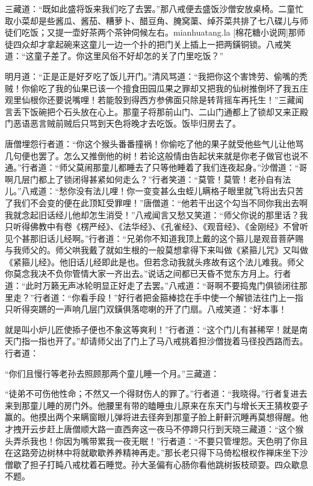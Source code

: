 \documentclass[12pt,UTF8]{ctexbook}
\begin{document}
三藏道：“既如此盛将饭来我们吃了去罢。”那八戒便去盛饭沙僧安放桌椅。二童忙取小菜却是些酱瓜、酱茄、糟萝卜、醋豆角、腌窝蕖、绰芥菜共排了七八碟儿与师徒们吃饭；又提一壶好茶两个茶钟伺候左右。mianhuatang.la [棉花糖小说网]那师徒四众却才拿起碗来这童儿一边一个扑的把门关上插上一把两鐄铜锁。八戒笑道：“这童子差了。你这里风俗不好却怎的关了门里吃饭？”

明月道：“正是正是好歹吃了饭儿开门。”清风骂道：“我把你这个害馋劳、偷嘴的秃贼！你偷吃了我的仙果已该一个擅食田园瓜果之罪却又把我的仙树推倒坏了我五庄观里仙根你还要说嘴哩！若能彀到得西方参佛面只除是转背摇车再托生！”三藏闻言丢下饭碗把个石头放在心上。那童子将那前山门、二山门通都上了锁却又来正殿门恶语恶言贼前贼后只骂到天色将晚才去吃饭。饭毕归房去了。

唐僧埋怨行者道：“你这个猴头番番撞祸！你偷吃了他的果子就受他些气儿让他骂几句便也罢了。怎么又推倒他的树！若论这般情由告起状来就是你老子做官也说不通。”行者道：“师父莫闹那童儿都睡去了只等他睡着了我们连夜起身。”沙僧道：“哥啊几层门都上了锁闭得甚紧如何走么？”行者笑道：“莫管！莫管！老孙自有法儿。”八戒道：“愁你没有法儿哩！你一变变甚么虫蛭儿瞒格子眼里就飞将出去只苦了我们不会变的便在此顶缸受罪哩！”唐僧道：“他若干出这个勾当不同你我出去啊我就念起旧话经儿他却怎生消受！”八戒闻言又愁又笑道：“师父你说的那里话？我只听得佛教中有卷《楞严经》、《法华经》、《孔雀经》、《观音经》、《金刚经》不曾听见个甚那旧话儿经啊。”行者道：“兄弟你不知道我顶上戴的这个箍儿是观音菩萨赐与我师父的。师父哄我戴了就如生根的一般莫想拿得下来叫做《紧箍儿咒》又叫做《紧箍儿经》。他旧话儿经即此是也。但若念动我就头疼故有这个法儿难我。师父你莫念我决不负你管情大家一齐出去。”说话之间都已天昏不觉东方月上。行者道：“此时万籁无声冰轮明显正好走了去罢。”八戒道：“哥啊不要捣鬼门俱锁闭往那里走？”行者道：“你看手段！”好行者把金箍棒捻在手中使一个解锁法往门上一指只听得突蹡的一声响几层门双鐄俱落唿喇的开了门扇。八戒笑道：“好本事！

就是叫小炉儿匠使掭子便也不象这等爽利！”行者道：“这个门儿有甚稀罕！就是南天门指一指也开了。”却请师父出了门上了马八戒挑着担沙僧拢着马径投西路而去。行者道：

“你们且慢行等老孙去照顾那两个童儿睡一个月。”三藏道：

“徒弟不可伤他性命；不然又一个得财伤人的罪了。”行者道：“我晓得。”行者复进去来到那童儿睡的房门外。他腰里有带的瞌睡虫儿原来在东天门与增长天王猜枚耍子赢的。他摸出两个来瞒窗眼儿弹将进去径奔到那童子脸上鼾鼾沉睡再莫想得醒。他才拽开云步赶上唐僧顺大路一直西奔这一夜马不停蹄只行到天晓三藏道：“这个猴头弄杀我也！你因为嘴带累我一夜无眠！”行者道：“不要只管埋怨。天色明了你且在这路旁边树林中将就歇歇养养精神再走。”那长老只得下马倚松根权作禅床坐下沙僧歇了担子打盹八戒枕着石睡觉。孙大圣偏有心肠你看他跳树扳枝顽耍。四众歇息不题。
\end{document}
